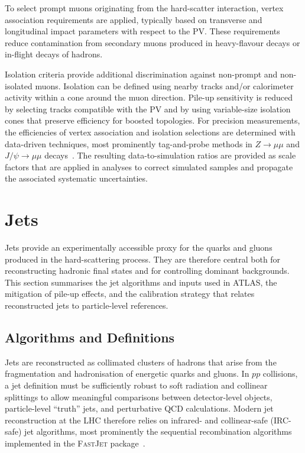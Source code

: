 To select prompt muons originating from the hard-scatter interaction, vertex
association requirements are applied, typically based on transverse and
longitudinal impact parameters with respect to the PV.
These requirements reduce contamination from secondary muons produced in
heavy-flavour decays or in-flight decays of hadrons.

Isolation criteria provide additional discrimination against non-prompt and
non-isolated muons.
Isolation can be defined using nearby tracks and/or calorimeter activity within a
cone around the muon direction.
Pile-up sensitivity is reduced by selecting tracks compatible with the PV and by
using variable-size isolation cones that preserve efficiency for boosted
topologies.
For precision measurements, the efficiencies of vertex association and isolation
selections are determined with data-driven techniques, most prominently
tag-and-probe methods in $Z\to\mu\mu$ and $J/\psi\to\mu\mu$ decays~\cite{ATLASMuonReco2021}.
The resulting data-to-simulation ratios are provided as scale factors that are
applied in analyses to correct simulated samples and propagate the associated
systematic uncertainties.

\section{Jets} 
Jets provide an experimentally accessible proxy for the quarks and gluons produced in the hard-scattering process. 
They are therefore central both for reconstructing hadronic final states and for controlling dominant backgrounds. 
This section summarises the jet algorithms and inputs used in ATLAS, the mitigation of pile-up effects, and the calibration strategy that relates reconstructed jets to particle-level references. 

\subsection{Algorithms and Definitions} 
Jets are reconstructed as collimated clusters of hadrons that arise from the fragmentation and hadronisation of energetic quarks and gluons. 
In $pp$ collisions, a jet definition must be sufficiently robust to soft radiation and collinear splittings to allow meaningful comparisons between detector-level objects, 
particle-level ``truth'' jets, and perturbative QCD calculations. 
Modern jet reconstruction at the LHC therefore relies on infrared- and collinear-safe (IRC-safe) jet algorithms, 
most prominently the sequential recombination algorithms implemented in the \textsc{FastJet} package~\cite{Cacciari2012FastJet}. 

